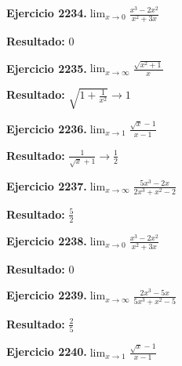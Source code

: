 \documentclass[10pt,a4paper]{article}
\begin{document}
\newpage
\begin{ejbox}
\textbf{Ejercicio 2234.}\quad $\lim_{x\to 0} \frac{x^3-2x^2}{x^2+3x}$
\end{ejbox}

\begin{solbox}
\textbf{Resultado:} \(\displaystyle 0\)
\end{solbox}

\begin{ejbox}
\textbf{Ejercicio 2235.}\quad $\lim_{x\to \infty} \frac{\sqrt{x^2+1}}{x}$
\end{ejbox}

\begin{solbox}
\textbf{Resultado:} \(\displaystyle \sqrt{1+\frac{1}{x^2}} \to 1\)
\end{solbox}

\begin{ejbox}
\textbf{Ejercicio 2236.}\quad $\lim_{x\to 1} \frac{\sqrt{x}-1}{x-1}$
\end{ejbox}

\begin{solbox}
\textbf{Resultado:} \(\displaystyle \frac{1}{\sqrt{x}+1} \to \frac{1}{2}\)
\end{solbox}

\newpage
\begin{ejbox}
\textbf{Ejercicio 2237.}\quad $\lim_{x\to \infty} \frac{5x^3 - 2x}{2x^3 + x^2 - 2}$
\end{ejbox}

\begin{solbox}
\textbf{Resultado:} \(\displaystyle \frac{5}{2}\)
\end{solbox}

\begin{ejbox}
\textbf{Ejercicio 2238.}\quad $\lim_{x\to 0} \frac{x^3-2x^2}{x^2+3x}$
\end{ejbox}

\begin{solbox}
\textbf{Resultado:} \(\displaystyle 0\)
\end{solbox}

\begin{ejbox}
\textbf{Ejercicio 2239.}\quad $\lim_{x\to \infty} \frac{2x^3 - 5x}{5x^3 + x^2 - 5}$
\end{ejbox}

\begin{solbox}
\textbf{Resultado:} \(\displaystyle \frac{2}{5}\)
\end{solbox}

\newpage
\begin{ejbox}
\textbf{Ejercicio 2240.}\quad $\lim_{x\to 1} \frac{\sqrt{x}-1}{x-1}$
\end{ejbox}
\end{document}
